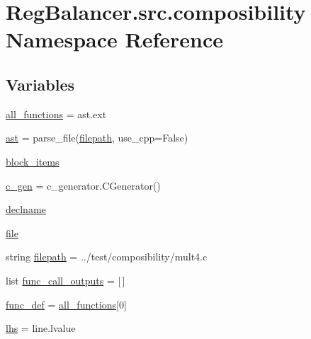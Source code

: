 \hypertarget{namespaceRegBalancer_1_1src_1_1composibility}{}\section{Reg\+Balancer.\+src.\+composibility Namespace Reference}
\label{namespaceRegBalancer_1_1src_1_1composibility}
\subsection*{Variables}
\begin{DoxyCompactItemize}
\item 
\hyperlink{namespaceRegBalancer_1_1src_1_1composibility_a66fdaaee4f1e3923f619ce48cda79c4b}{all\+\_\+functions} = ast.\+ext
\item 
\hyperlink{namespaceRegBalancer_1_1src_1_1composibility_a83d838e3813fb5999c0492e0d9474bd9}{ast} = parse\+\_\+file(\hyperlink{namespaceRegBalancer_1_1src_1_1composibility_ad0ede32ef292a83cc0fde90bb81978c4}{filepath}, use\+\_\+cpp=False)
\item 
\hyperlink{namespaceRegBalancer_1_1src_1_1composibility_aef6cb15d000f3eb44586433c8b067068}{block\+\_\+items}
\item 
\hyperlink{namespaceRegBalancer_1_1src_1_1composibility_a3f696370e9fad0f95d9d7fef40cf2bcc}{c\+\_\+gen} = c\+\_\+generator.\+C\+Generator()
\item 
\hyperlink{namespaceRegBalancer_1_1src_1_1composibility_ac5c76c0448d4b265e8faf0bd0319ed41}{declname}
\item 
\hyperlink{namespaceRegBalancer_1_1src_1_1composibility_a40a5d58ffa6e88aa578d6683ac413105}{file}
\item 
string \hyperlink{namespaceRegBalancer_1_1src_1_1composibility_ad0ede32ef292a83cc0fde90bb81978c4}{filepath} = \textquotesingle{}../test/composibility/mult4.\+c\textquotesingle{}
\item 
list \hyperlink{namespaceRegBalancer_1_1src_1_1composibility_ab591e3ac73982297a6110aac7105546f}{func\+\_\+call\+\_\+outputs} = \mbox{[}$\,$\mbox{]}
\item 
\hyperlink{namespaceRegBalancer_1_1src_1_1composibility_a2ca84f740f9f5532d08ce6706ab8c818}{func\+\_\+def} = \hyperlink{namespaceRegBalancer_1_1src_1_1composibility_a66fdaaee4f1e3923f619ce48cda79c4b}{all\+\_\+functions}\mbox{[}0\mbox{]}
\item 
\hyperlink{namespaceRegBalancer_1_1src_1_1composibility_a204f446339af7929852f44df41484be5}{lhs} = line.\+lvalue

\end{DoxyCompactItemize}
